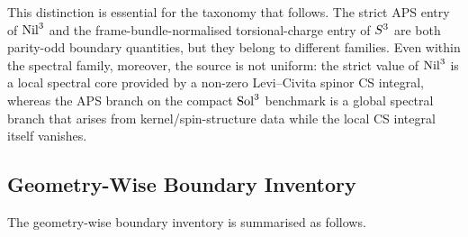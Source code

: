 This distinction is essential for the taxonomy that follows.  The strict APS
entry of $\mathrm{Nil}^3$ and the frame-bundle-normalised torsional-charge entry
of $S^3$ are both parity-odd boundary quantities, but they belong to
different families.  Even within the spectral family, moreover, the source is
not uniform: the strict value of $\mathrm{Nil}^3$ is a local spectral core
provided by a non-zero Levi--Civita spinor CS integral, whereas the APS
branch on the compact $\mathrm{Sol}^3$ benchmark is a global spectral branch
that arises from kernel/spin-structure data while the local CS integral
itself vanishes.

\subsection{Geometry-Wise Boundary Inventory}
\label{sec:boundary:inventory}

The geometry-wise boundary inventory is summarised as follows.

\begin{table}[H]
\centering
{}
\caption{Geometry-wise boundary inventory.}
\label{tab:boundary}
\end{table}

